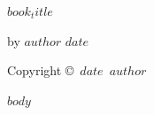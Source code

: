 \documentclass[12pt]{book}
\def\booktitle{$book_title$}
\def\bookauthor{$author$}
\def\bookdate{$date$}
\begin{document}
\thispagestyle{empty}
\begin{center}
\vspace*{2in}
{\LARGE\bfseries\booktitle\par}
\bigskip
by \bookauthor
\vfill
\bookdate
\end{center}

\clearpage
\thispagestyle{empty}
\vspace*{\fill}
Copyright \copyright\ \bookdate\ \bookauthor
\vspace*{\fill}

\clearpage
\tableofcontents

\mainmatter

$body$
\end{document}
